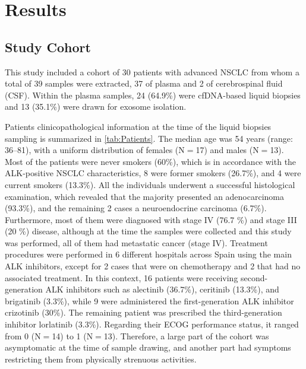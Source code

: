 \chapter{Results}

\section{Study Cohort}

This study included a cohort of 30 patients with advanced NSCLC from whom a total of 39 samples were extracted, 37 of plasma and 2 of cerebrospinal fluid (CSF). Within the plasma samples, 24 (64.9\%) were cfDNA-based liquid biopsies and 13 (35.1\%) were drawn for exosome isolation.

Patients clinicopathological information at the time of the liquid biopsies sampling is summarized in \autoref{tab:Patients}. The median age was 54 years (range: 36–81), with a uniform distribution of females (N$=$17) and males (N$=$13). Most of the patients were never smokers (60\%), which is in accordance with the ALK-positive NSCLC characteristics, 8 were former smokers (26.7\%), and 4 were current smokers (13.3\%). All the individuals underwent a successful histological examination, which revealed that the majority presented an adenocarcinoma (93.3\%), and the remaining 2 cases a neuroendocrine carcinoma (6.7\%). Furthermore, most of them were diagnosed with stage IV (76.7 \%) and stage III (20 \%) disease, although at the time the samples were collected and this study was performed, all of them had metastatic cancer (stage IV). Treatment procedures were performed in 6 different hospitals across Spain using the main ALK inhibitors, except for 2 cases that were on chemotherapy and 2 that had no associated treatment. In this context, 16 patients were receiving second-generation ALK inhibitors such as alectinib (36.7\%), ceritinib (13.3\%), and brigatinib (3.3\%), while 9 were administered the first-generation ALK inhibitor crizotinib (30\%). The remaining patient was prescribed the third-generation inhibitor lorlatinib (3.3\%). Regarding their ECOG performance status, it ranged from 0 (N$=$14) to 1 (N$=$13). Therefore, a large part of the cohort was asymptomatic at the time of sample drawing, and another part had symptoms restricting them from physically strenuous activities.

